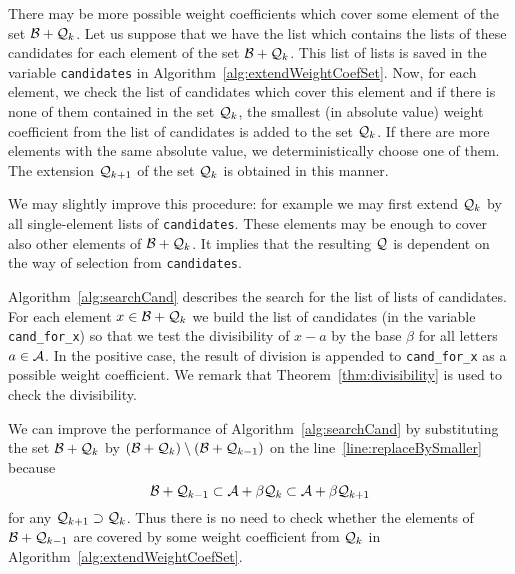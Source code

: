 \begin{upravit}

There may be more possible weight coefficients which cover some element of the set $\mathcal{B}+ \mathcal{Q}_k$. Let us suppose that we have the list which contains the lists of these candidates for each element of the set $\mathcal{B}+ \mathcal{Q}_k$. This list of lists is saved in the variable \verb+candidates+ in Algorithm~\ref{alg:extendWeightCoefSet}. Now, for each element, we check the list of candidates which cover this element and if there is none of them contained in the set $\mathcal{Q}_k$, the smallest (in absolute value) weight coefficient from the list of candidates is added to the set $\mathcal{Q}_k$. If there are more elements with the same absolute value, we deterministically choose one of them. The extension $\mathcal{Q}_{k+1}$ of the set $\mathcal{Q}_k$ is obtained in this manner.   

We may slightly improve this procedure: for example we may first extend $\mathcal{Q}_{k}$ by all single-element lists of \verb+candidates+. These elements may be enough to cover also other elements of $\mathcal{B}+\mathcal{Q}_{k}$. It implies that the resulting $\mathcal{Q}$ is dependent on the way of selection from \verb+candidates+.

Algorithm~\ref{alg:searchCand} describes the search for the list of lists of candidates. For each element $x\in \mathcal{B} + \mathcal{Q}_{k}$ we build the list of candidates (in the variable \verb+cand_for_x+) so that we test the divisibility of $x-a$ by the base $\beta$ for all letters $a\in\mathcal{A}$. In the positive case, the result of division is appended to \verb+cand_for_x+ as a possible weight coefficient. We remark that Theorem~\ref{thm:divisibility} is used to check the divisibility.

We can improve the performance of Algorithm~\ref{alg:searchCand} by substituting the set $\mathcal{B} + \mathcal{Q}_{k}$ by $(\mathcal{B} + \mathcal{Q}_{k})\setminus (\mathcal{B} + \mathcal{Q}_{k-1})$ on the line~\ref{line:replaceBySmaller} because
$$
\mathcal{B} + \mathcal{Q}_{k-1} \subset \mathcal{A} + \beta \mathcal{Q}_{k} \subset \mathcal{A} + \beta \mathcal{Q}_{k+1}
$$
for any $\mathcal{Q}_{k+1} \supset \mathcal{Q}_{k}$. Thus there is no need to check whether the elements of $\mathcal{B} + \mathcal{Q}_{k-1}$ are covered by some weight coefficient from $\mathcal{Q}_k$ in Algorithm~\ref{alg:extendWeightCoefSet}.

\end{upravit}
